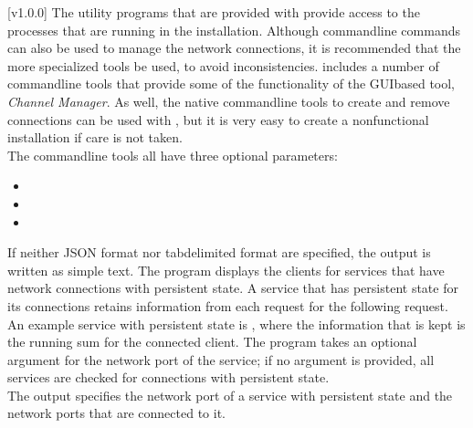 [v1.0.0]
The utility programs that are provided with \mplusm{} provide access to the processes that
are running in the \mplusm{} installation.
Although command\longDash{}line \yarp{} commands can also be used to manage the network
connections, it is recommended that the more specialized \mplusm{} tools be used, to avoid
inconsistencies.
\mplusm{} includes a number of command\longDash{}line tools that provide some of the
functionality of the GUI\longDash{}based tool, \emph{Channel Manager}.
As well, the native \yarp{} command\longDash{}line tools to create and remove connections
can be used with \mplusm{}, but it is very easy to create a non\longDash{}functional
installation if care is not taken.\\

The command\longDash{}line tools all have three optional parameters:
\begin{itemize}
\item{}
\item\exSp{}
\item\exSp{}
\end{itemize}
If neither JSON format nor tab\longDash{}delimited format are specified, the output is
written as simple text.
The program  displays the clients for services that have
\yarp{} network connections with persistent state.
A service that has persistent state for its connections retains information from each
request for the following request.
An example service with persistent state is
, where the information that is kept is the
running sum for the connected client.
The program takes an optional argument for the \yarp{} network port of the service; if no
argument is provided, all services are checked for connections with persistent state.\\

The output specifies the \yarp{} network port of a service with persistent state and the
\yarp{} network ports that are connected to it.\\

